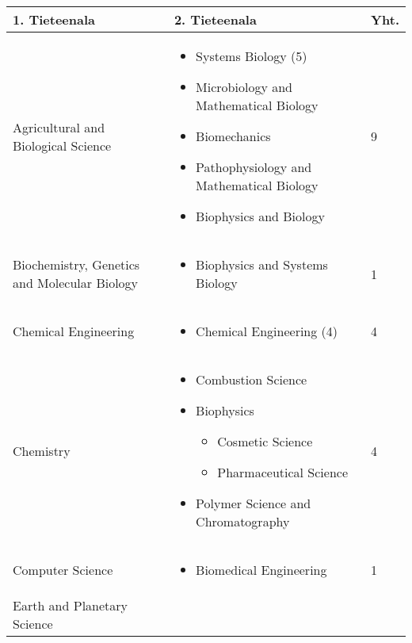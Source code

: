 \documentclass[utf8]{gradu3}
\begin{document}
\begin{longtable}[h]{|p{5cm}|p{8cm}|p{1cm}|}
    \hline
    \textbf{1. Tieteenala}    & \textbf{2. Tieteenala} & \textbf{Yht.} \\
    \hline
     Agricultural and Biological Science   & 
        \begin{itemize}[noitemsep,topsep=0pt]
            \item Systems Biology (5)
            \item Microbiology and Mathematical Biology
            \item Biomechanics
            \item Pathophysiology and Mathematical Biology
            \item Biophysics and Biology
        \end{itemize} & 9 \\
     \hline
     Biochemistry, Genetics and Molecular Biology & 
     \begin{itemize}[nosep]
         \item Biophysics and Systems Biology
     \end{itemize} & 1 \\
     \hline
     Chemical Engineering & 
     \begin{itemize}[nosep]
         \item Chemical Engineering (4)
     \end{itemize} & 4 \\
     \hline
     Chemistry & 
     \begin{itemize}[nosep]
        \item Combustion Science
        \item Biophysics
        \begin{itemize}[nosep]
            \item Cosmetic Science
            \item Pharmaceutical Science
        \end{itemize}
        \item Polymer Science and Chromatography
    \end{itemize} & 4 \\
     \hline
     Computer Science & \begin{itemize}[nosep]
         \item Biomedical Engineering
     \end{itemize} & 1 \\
     \hline
     Earth and Planetary Science & 
        \begin{itemize} [nosep]

\end{itemize}
\end{longtable}
\end{document}
